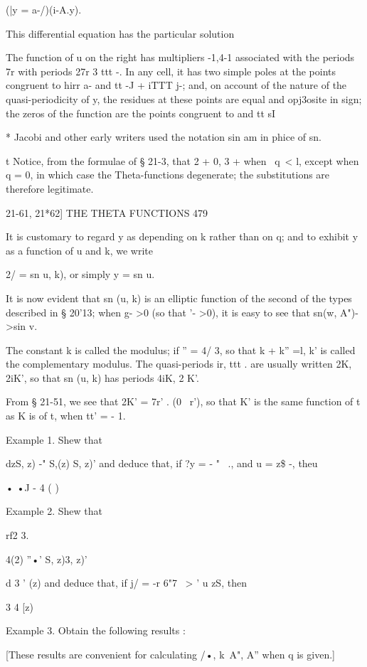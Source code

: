 (|y = a-/)(i-A.y).

This differential equation has the particular solution

The function of u on the right has multipliers -1,4-1 associated with
the periods 7r%
with periods 27r 3 ttt -. In any cell, it has two simple poles at the
points congruent to hirr a- and tt -J + iTTT j-; and, on account of
the nature of the quasi-periodicity of y, the residues at these points
are equal and opj3osite in sign; the zeros of the function are the
points congruent to and tt sI

* Jacobi and other early writers used the notation sin am in phice of
sn.

t Notice, from the formulae of § 21-3, that 2 + 0, 3 + when \ q\ < l,
except when q = 0, in which case the Theta-functions degenerate; the
substitutions are therefore legitimate.

21-61, 21*62] THE THETA FUNCTIONS 479

It is customary to regard y as depending on k rather than on q; and
to exhibit y as a function of u and k, we write

2/ = sn u, k), or simply y = sn u.

It is now evident that sn (u, k) is an elliptic function of the second
of the types described in § 20'13; when g- >0 (so that '- >0), it is
easy to see that sn(w, A")- >sin v.

The constant k is called the modulus; if '' = 4/ 3, so that k + k''
=l, k' is called the complementary modulus. The quasi-periods ir, ttt
. are usually written 2K, 2iK', so that sn (u, k) has periods 4iK, 2
K'.

From § 21-51, we see that 2K' = 7r' . (0 \ r'), so that K' is the same
function of t as K is of t, when tt' = - 1.

Example 1. Shew that

dzS, z) -" S,(z) S, z)' and deduce that, if ?y = - " ~., and u = z\$
-, theu

• •J - 4 ( )

Example 2. Shew that

rf2 3.

4(2) ''•' S, z)3, z)'

d 3 ' (z) and deduce that, if j/ = -r 6"7 \ > ' u zS, then

 3 4 [z)

Example 3. Obtain the following results :

[These results are convenient for calculating /•, k\ A", A'' when q is
given.]

